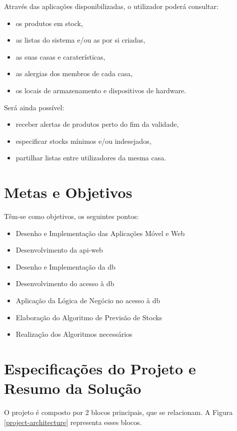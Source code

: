 Através das aplicações disponibilizadas, o utilizador poderá consultar:
\begin{itemize} \itemsep 0pt
	\item os produtos em stock,
	\item as listas do sistema e/ou as por si criadas,
	\item as suas casas e caraterísticas,
	\item as alergias dos membros de cada casa,
	\item os locais de armazenamento e dispositivos de hardware.
\end{itemize}

Será ainda possível:
\begin{itemize} \itemsep 0pt
	\item receber alertas de produtos perto do fim da validade,
	\item especificar stocks mínimos e/ou indesejados,
	\item partilhar listas entre utilizadores da mesma casa.
\end{itemize}

%
%
\section{Metas e Objetivos} \label{sec12}
Têm-se como objetivos, os seguintes pontos:
\begin{itemize} \itemsep 0pt
	\item Desenho e Implementação das Aplicações Móvel e Web
	\item Desenvolvimento da \gls{api-web}
	\item Desenho e Implementação da \acrshort{db}
	\item Desenvolvimento do acesso à \acrshort{db}
	\item Aplicação da Lógica de Negócio no acesso à \acrshort{db}
	\item Elaboração do Algoritmo de Previsão de Stocks
	\item Realização dos Algoritmos necessários
\end{itemize}


%
%
\section{Especificações do Projeto e Resumo da Solução} \label{sec13}

O projeto é composto por 2 blocos principais, que se relacionam. A Figura \ref{project-architecture} representa esses blocos. 

